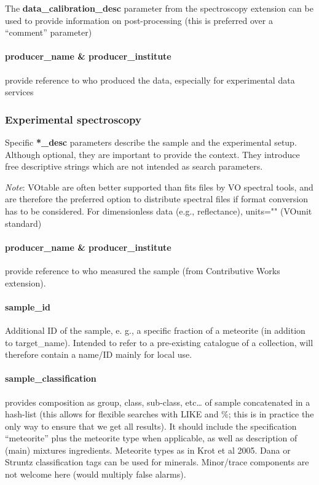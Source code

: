\documentclass[11pt,a4paper]{ivoa}
\begin{document}
The\textbf{ \textbf{data\_calibration\_desc}} parameter from the spectroscopy extension can be used to provide information on post-processing (this is preferred over a ``comment'' parameter)

\paragraph{producer\_name \& producer\_institute\\}

provide reference to who produced the data, especially for experimental data services

\subsubsection{Experimental spectroscopy}

Specific \textbf{*\_desc} parameters describe the sample and the experimental setup. Although optional, they are important to provide the context. They introduce free descriptive strings which are not intended as search parameters.

\emph{Note}: VOtable are often better supported than fits files by VO spectral tools, and are therefore the preferred option to distribute spectral files if format conversion has to be considered. For dimensionless data (e.g., reflectance), units="" (VOunit standard)

\paragraph{producer\_name \& producer\_institute}

provide reference to who measured the sample (from Contributive Works extension).

\paragraph{sample\_id}

Additional ID of the sample, e. g., a specific fraction of a meteorite (in addition to target\_name). Intended to refer to a pre-existing catalogue of a collection, will therefore contain a name/ID mainly for local use. 

\paragraph{sample\_classification}

provides composition as group, class, sub-class, etc… of sample concatenated in a hash-list (this allows for flexible searches with LIKE and \%; this is in practice the only way to ensure that we get all results). It should include the specification ``meteorite'' plus the meteorite type when applicable, as well as description of (main) mixtures ingredients. Meteorite types as in Krot et al 2005. Dana or Struntz classification tags can be used for minerals. Minor/trace components are not welcome here (would multiply false alarms).
\end{document}
